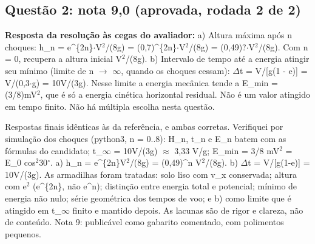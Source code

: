 \documentclass{article}%
\begin{document}
\subsection*{Questão 2: nota 9,0 (aprovada, rodada 2 de 2)}%
\textbf{Resposta da resolução às cegas do avaliador:} a) Altura máxima após n choques: h\_n = e\^{}\{2n\}$\cdot$V$^2$/(8g) = (0,7)\^{}\{2n\}$\cdot$V$^2$/(8g) = (0,49)?$\cdot$V$^2$/(8g). Com n = 0, recupera a altura inicial V$^2$/(8g).\newline%
\newline%
b) Intervalo de tempo até a energia atingir seu mínimo (limite de n $\to$ $\infty$, quando os choques cessam): $\Delta$t = V/{[}g(1 - e){]} = V/(0,3$\cdot$g) = 10V/(3g). Nesse limite a energia mecânica tende a E\_min = (3/8)mV$^2$, que é só a energia cinética horizontal residual. Não é um valor atingido em tempo finito.\newline%
\newline%
Não há múltipla escolha nesta questão.\par %
Respostas finais idênticas às da referência, e ambas corretas. Verifiquei por simulação dos choques (python3, n = 0..8): H\_n, t\_n e E\_n batem com as fórmulas do candidato; t\_$\infty$ = 10V/(3g) $\approx$ 3,33 V/g; E\_min = 3/8 mV$^2$ = E\_0 cos$^2$30$^\circ$. a) h\_n = e\^{}\{2n\}V$^2$/(8g) = (0,49)\^{}n V$^2$/(8g). b) $\Delta$t = V/{[}g(1-e){]} = 10V/(3g). As armadilhas foram tratadas: solo liso com v\_x conservada; altura com e$^2$ (e\^{}\{2n\}, não e\^{}n); distinção entre energia total e potencial; mínimo de energia não nulo; série geométrica dos tempos de voo; e b) como limite que é atingido em t\_$\infty$ finito e mantido depois. As lacunas são de rigor e clareza, não de conteúdo. Nota 9: publicável como gabarito comentado, com polimentos pequenos.%
\end{document}
